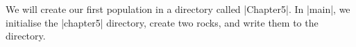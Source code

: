 We will create our first population in a directory called |Chapter5|.
In |main|, we initialise the |chapter5| directory, create two rocks,
and write them to the directory.


